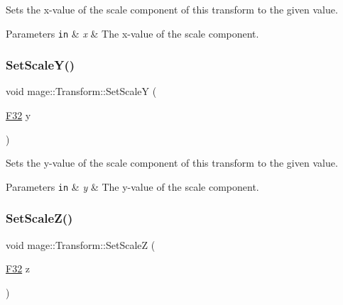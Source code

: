 Sets the x-\/value of the scale component of this transform to the given value.


\begin{DoxyParams}[1]{Parameters}
\mbox{\tt in}  & {\em x} & The x-\/value of the scale component. \\
\hline
\end{DoxyParams}
\hypertarget{classmage_1_1_transform_a953a89b7f7ed2ec47eb05074d43e35c6}{}\label{classmage_1_1_transform_a953a89b7f7ed2ec47eb05074d43e35c6} 
\subsubsection{\texorpdfstring{Set\+Scale\+Y()}{SetScaleY()}}
{\footnotesize\ttfamily void mage\+::\+Transform\+::\+Set\+ScaleY (\begin{DoxyParamCaption}\item[{\hyperlink{namespacemage_aa97e833b45f06d60a0a9c4fc22ae02c0}{F32}}]{y }\end{DoxyParamCaption})\hspace{0.3cm}{\ttfamily [noexcept]}}

Sets the y-\/value of the scale component of this transform to the given value.


\begin{DoxyParams}[1]{Parameters}
\mbox{\tt in}  & {\em y} & The y-\/value of the scale component. \\
\hline
\end{DoxyParams}
\hypertarget{classmage_1_1_transform_aa8fa7169c739cd1e005bbb373ccbf6c3}{}\label{classmage_1_1_transform_aa8fa7169c739cd1e005bbb373ccbf6c3} 
\subsubsection{\texorpdfstring{Set\+Scale\+Z()}{SetScaleZ()}}
{\footnotesize\ttfamily void mage\+::\+Transform\+::\+Set\+ScaleZ (\begin{DoxyParamCaption}\item[{\hyperlink{namespacemage_aa97e833b45f06d60a0a9c4fc22ae02c0}{F32}}]{z }\end{DoxyParamCaption})\hspace{0.3cm}{\ttfamily [noexcept]}}

